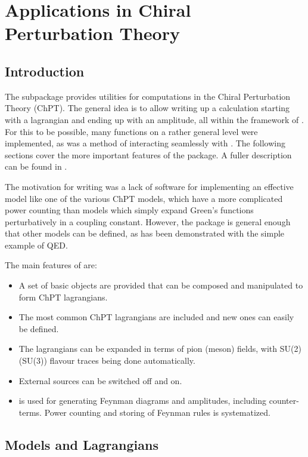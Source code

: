 \section{Applications in Chiral Perturbation Theory}

\subsection{Introduction}

The subpackage \fphi provides utilities for computations in the Chiral Perturbation Theory (ChPT). The general idea is to allow writing up a calculation starting with a lagrangian and ending up with an amplitude, all within the framework of \fc. For this to be possible, many functions on a rather general level were implemented, as was a method of interacting seamlessly with \fa. The following sections cover the more important features of the package. A fuller description can be found in \cite{PHI}.

The motivation for writing \fphi was a lack of software for implementing an effective model like one of the various ChPT models, which have a more complicated power counting than models which simply expand Green's functions perturbatively in a coupling constant. However, the package is general enough that other models can be defined, as has been demonstrated with the simple example of QED.

The main features of \fphi are:
\begin{itemize}
\item A set of basic objects are provided that can be composed and manipulated to form ChPT lagrangians.
\item The most common ChPT lagrangians are included and new ones can easily be defined.
\item The lagrangians can be expanded in terms of pion (meson) fields, with SU(2) (SU(3)) flavour traces being done automatically.
\item External sources can be switched off and on.
\item \fa is used for generating Feynman diagrams and amplitudes, including counter-terms. Power counting and storing of Feynman rules is systematized.
\end{itemize}

\subsection{Models and Lagrangians}

